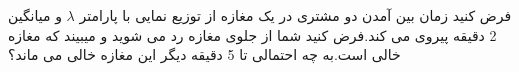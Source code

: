 
فرض کنید زمان بین آمدن دو مشتری در یک مغازه از توزیع نمایی با پارامتر $\lambda$  و میانگین 2 دقیقه پیروی می کند.فرض کنید شما از جلوی مغازه رد می شوید و میبیند که مغازه خالی است.به چه احتمالی تا 5 دقیقه دیگر این مغازه خالی می ماند؟
